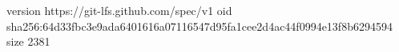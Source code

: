 version https://git-lfs.github.com/spec/v1
oid sha256:64d33fbc3e9ada6401616a07116547d95fa1cee2d4ac44f0994e13f8b6294594
size 2381
